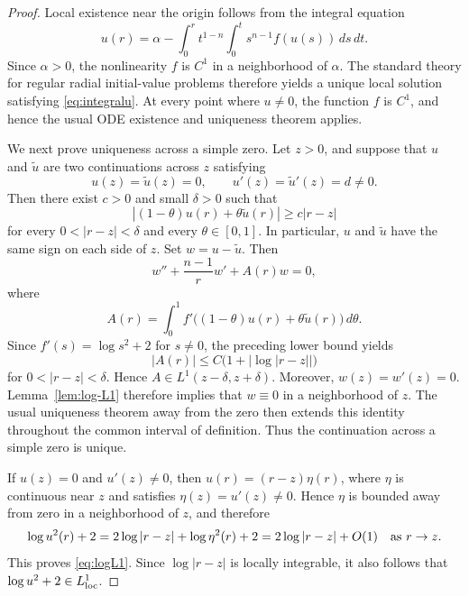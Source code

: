 \documentclass[11pt]{article}
\begin{document}
\begin{proof}
Local existence near the origin follows from the integral equation
\begin{equation}\label{eq:integralu}
 u(r)=\alpha-\int_0^r t^{1-n}\int_0^t s^{n-1}f(u(s))\,ds\,dt.
\end{equation}
Since $\alpha>0$, the nonlinearity $f$ is $C^1$ in a neighborhood of $\alpha$. The standard theory for regular radial initial-value problems therefore yields a unique local solution satisfying \eqref{eq:integralu}. At every point where $u\ne0$, the function $f$ is $C^1$, and hence the usual ODE existence and uniqueness theorem applies.

We next prove uniqueness across a simple zero. Let $z>0$, and suppose that $u$ and $\tilde u$ are two continuations across $z$ satisfying
\[
 u(z)=\tilde u(z)=0,
 \qquad
 u'(z)=\tilde u'(z)=d\ne0.
\]
Then there exist $c>0$ and small $\delta>0$ such that
\[
 |(1-\theta)u(r)+\theta\tilde u(r)|\geq c|r-z|
\]
for every $0<|r-z|<\delta$ and every $\theta\in[0,1]$. In particular, $u$ and $\tilde u$ have the same sign on each side of $z$.
Set $w=u-\tilde u$. Then
\[
 w''+\frac{n-1}{r}w'+A(r)w=0,
\]
where
\begin{equation*}
  A(r)=\int_0^1
f'\bigl((1-\theta) u(r)+\theta \tilde u(r)\bigr)\,d\theta.
\end{equation*}
Since $f'(s)=\log s^2+2$ for $s\ne 0$, the preceding lower bound
yields
\begin{equation*}
|A(r)|\le C\bigl(1+|\log|r-z||\bigr)
\end{equation*}
 for $0<|r-z|<\delta$.
Hence $A\in L^1(z-\delta,z+\delta)$. Moreover, $w(z)=w'(z)=0$. Lemma~\ref{lem:log-L1} therefore implies that $w\equiv0$ in a neighborhood of $z$. The usual uniqueness theorem away from the zero then extends this identity throughout the common interval of definition. Thus the continuation across a simple zero is unique.

If $u(z)=0$ and $u'(z)\ne0$, then $u(r)=(r-z)\eta(r)$, where $\eta$ is continuous near $z$ and satisfies $\eta(z)=u'(z)\ne0$. Hence $\eta$ is bounded away from zero in a neighborhood of $z$, and therefore
\[
 \log u^2(r)+2=2\log|r-z|+\log \eta^2(r)+2=2\log|r-z|+O(1)
 \quad\hbox{as }r\to z.
\]
This proves \eqref{eq:logL1}. Since $\log|r-z|$ is locally integrable, it also follows that $\log u^2+2\in L^1_{\rm loc}$.


\end{proof}
\end{document}
